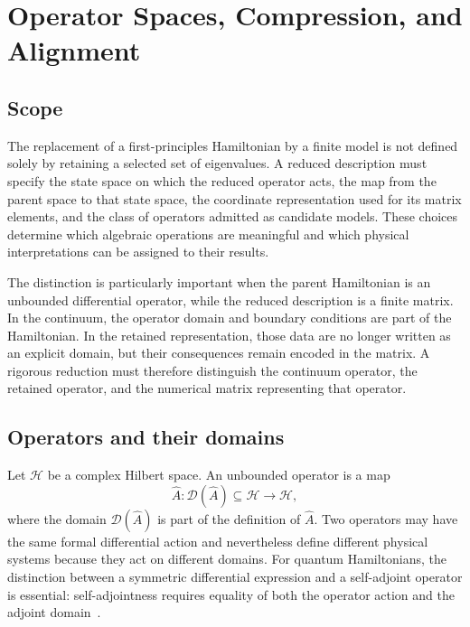 \chapter{Operator Spaces, Compression, and Alignment}

\label{app:operator-spaces}

\section{Scope}

The replacement of a first-principles Hamiltonian by a finite model is not
defined solely by retaining a selected set of eigenvalues. A reduced
description must specify the state space on which the reduced operator acts,
the map from the parent space to that state space, the coordinate
representation used for its matrix elements, and the class of operators
admitted as candidate models. These choices determine which algebraic
operations are meaningful and which physical interpretations can be assigned
to their results.

The distinction is particularly important when the parent Hamiltonian is an
unbounded differential operator, while the reduced description is a finite
matrix. In the continuum, the operator domain and boundary conditions are part
of the Hamiltonian. In the retained representation, those data are no longer
written as an explicit domain, but their consequences remain encoded in the
matrix. A rigorous reduction must therefore distinguish the continuum
operator, the retained operator, and the numerical matrix representing that
operator.

\section{Operators and their domains}


Let $\mathcal H$ be a complex Hilbert space. An unbounded operator is a map
\begin{equation}
    \hat A:
    \mathcal D(\hat A)\subseteq\mathcal H
    \longrightarrow
    \mathcal H,
\end{equation}
where the domain $\mathcal D(\hat A)$ is part of the definition of $\hat A$.
Two operators may have the same formal differential action and nevertheless
define different physical systems because they act on different domains. For
quantum Hamiltonians, the distinction between a symmetric differential
expression and a self-adjoint operator is essential: self-adjointness requires
equality of both the operator action and the adjoint domain~\cite{teschl2014,reedSimon1975,schmudgen2012}.

